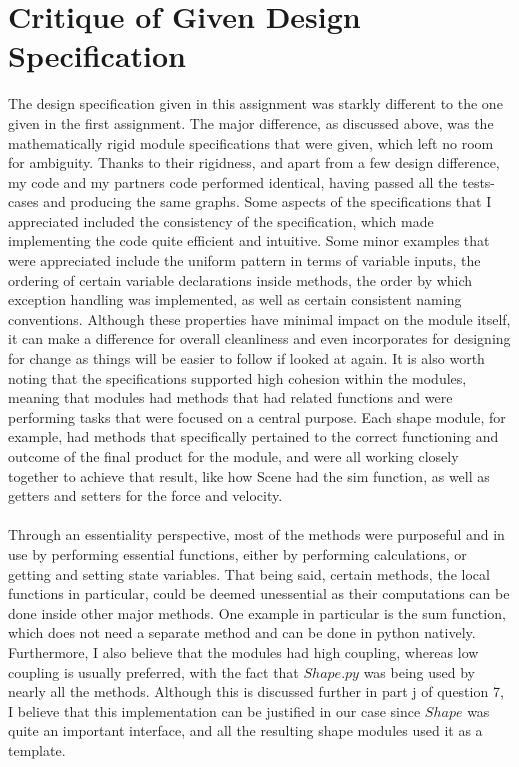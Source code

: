 \documentclass[12pt]{article}
\begin{document}
\section{Critique of Given Design Specification}
The design specification given in this assignment was starkly different to the one given in the first assignment. The major difference, as discussed above, was the mathematically rigid module specifications that were given, which left no room for ambiguity. Thanks to their rigidness, and apart from a few design difference, my code and my partners code performed identical, having passed all the tests-cases and producing the same graphs. Some aspects of the specifications that I appreciated included the consistency of the specification, which made implementing the code quite efficient and intuitive. Some minor examples that were appreciated include the uniform pattern in terms of variable inputs, the ordering of certain variable declarations inside methods, the order by which exception handling was implemented, as well as certain consistent naming conventions. Although these properties have minimal impact on the module itself, it can make a difference for overall cleanliness and even incorporates for designing for change as things will be easier to follow if looked at again. It is also worth noting that the specifications supported high cohesion within the modules, meaning that modules had methods that had related functions and were performing tasks that were focused on a central purpose. Each shape module, for example, had methods that specifically pertained to the correct functioning and outcome of the final product for the module, and were all working closely together to achieve that result, like how Scene had the sim function, as well as getters and setters for the force and velocity.
\\\\
Through an essentiality perspective, most of the methods were purposeful and in use by performing essential functions, either by performing calculations, or getting and setting state variables. That being said, certain methods, the local functions in particular, could be deemed unessential as their computations can be done inside other major methods. One example in particular is the sum function, which does not need a separate method and can be done in python natively.\\ Furthermore, I also believe that the modules had high coupling, whereas low coupling is usually preferred, with the fact that $Shape.py$ was being used by nearly all the methods. Although this is discussed further in part j of question 7, I believe that this implementation can be justified in our case since $Shape$ was quite an important interface, and all the resulting shape modules used it as a template.
\end{document}

